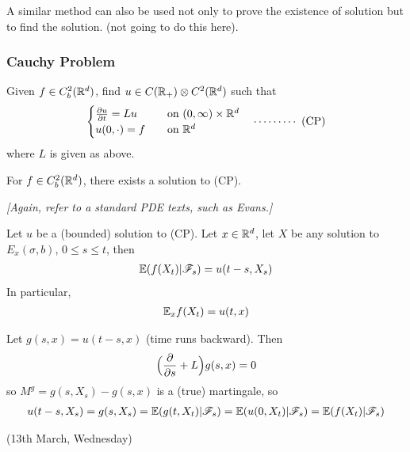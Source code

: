 \documentclass[12pt,a4paper]{article}
\newenvironment{proof}
{\begin{changemargin}{0.5cm}{0.5cm} 
	}%
	{\end{changemargin}
}
\newenvironment{p}
{\begin{proof} 
	}%
	{\end{proof}
}
\begin{document}
A similar method can also be used not only to prove the existence of solution but to find the solution. (not going to do this here).
\s

\subsubsection*{Cauchy Problem}

Given $f\in C_b^2(\mathbb{R}^d)$, find $u\in C(\mathbb{R}_+) \otimes C^2(\mathbb{R}^d)$ such that
\begin{align*}
\begin{cases}
\frac{\partial u}{\partial t} = Lu \quad & \text{on } (0, \infty) \times \mathbb{R}^d \\
u(0, \cdot) =f \quad & \text{on }\mathbb{R}^d
\end{cases} \quad \cdots\cdots\cdots\,\,(\text{CP})
\end{align*}
where $L$ is given as above.
\s

\thm For $f\in C_b^2(\mathbb{R}^d)$, there exists a solution to (CP).

\emph{[Again, refer to a standard PDE texts, such as Evans.]}
\s

\thm Let $u$ be a (bounded) solution to (CP). Let $x\in \mathbb{R}^d$, let $X$ be any solution to $E_x(\sigma, b)$, $0\leq s\leq t$, then
\begin{align*}
\mathbb{E}(f(X_t ) | \mathscr{F}_s) = u(t-s, X_s)
\end{align*}
In particular,
\begin{align*}
\mathbb{E}_x f(X_t) = u(t, x)
\end{align*}
\begin{p}
\pf Let $g(s, x) = u(t-s, x)$ (time runs backward). Then
\begin{align*}
\Big(\frac{\partial}{\partial s} + L \Big) g(s, x) = 0
\end{align*}
so $M^g = g(s, X_s) - g(s,x)$ is a (true) martingale, so
\begin{align*}
u(t-s, X_s) = g(s, X_s) = \mathbb{E} (g(t, X_t) | \mathscr{F}_s )= \mathbb{E} (u(0, X_t) | \mathscr{F}_s) = \mathbb{E}(f(X_t)| \mathscr{F}_s)
\end{align*}
\eop
\end{p}
\s
\s

\newday

(13th March, Wednesday)
\s
\end{document}
